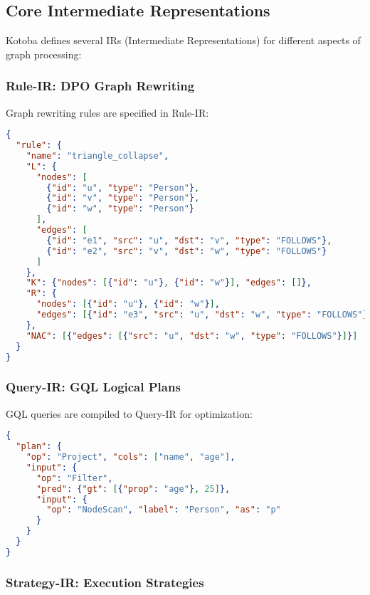 \documentclass[11pt,a4paper]{article}
\begin{document}
\subsection{Core Intermediate Representations}
\label{subsec:ir_design}

Kotoba defines several IRs (Intermediate Representations) for different aspects of graph processing:

\subsubsection{Rule-IR: DPO Graph Rewriting}
\label{subsubsec:rule_ir}

Graph rewriting rules are specified in Rule-IR:

\begin{lstlisting}[language=json,caption=DPO Rule-IR example]
{
  "rule": {
    "name": "triangle_collapse",
    "L": {
      "nodes": [
        {"id": "u", "type": "Person"},
        {"id": "v", "type": "Person"},
        {"id": "w", "type": "Person"}
      ],
      "edges": [
        {"id": "e1", "src": "u", "dst": "v", "type": "FOLLOWS"},
        {"id": "e2", "src": "v", "dst": "w", "type": "FOLLOWS"}
      ]
    },
    "K": {"nodes": [{"id": "u"}, {"id": "w"}], "edges": []},
    "R": {
      "nodes": [{"id": "u"}, {"id": "w"}],
      "edges": [{"id": "e3", "src": "u", "dst": "w", "type": "FOLLOWS"}]
    },
    "NAC": [{"edges": [{"src": "u", "dst": "w", "type": "FOLLOWS"}]}]
  }
}
\end{lstlisting}

\subsubsection{Query-IR: GQL Logical Plans}
\label{subsubsec:query_ir}

GQL queries are compiled to Query-IR for optimization:

\begin{lstlisting}[language=json,caption=GQL Query-IR example]
{
  "plan": {
    "op": "Project", "cols": ["name", "age"],
    "input": {
      "op": "Filter",
      "pred": {"gt": [{"prop": "age"}, 25]},
      "input": {
        "op": "NodeScan", "label": "Person", "as": "p"
      }
    }
  }
}
\end{lstlisting}

\subsubsection{Strategy-IR: Execution Strategies}
\label{subsubsec:strategy_ir}
\end{document}
